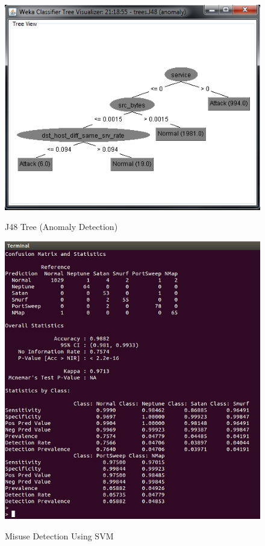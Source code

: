 \documentclass{article}
\begin{document}
\begin{figure}
  \begin{center}
    \includegraphics{Anomaly_J48_Tree.png}
    \label{J48 Tree (Anomaly Detection)}
    \caption{J48 Tree (Anomaly Detection)}
  \end{center}
\end{figure}

\begin{figure}
  \begin{center}
    \includegraphics{Misuse_SVM_cropped.png}
    \label{Misuse Detection Using SVM}
    \caption{Misuse Detection Using SVM}
  \end{center}
\end{figure}
 
\end{document}
